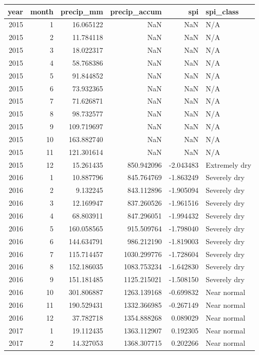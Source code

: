 \begin{tabular}{rrrrrl}
\toprule
year & month & precip\_mm & precip\_accum & spi & spi\_class \\
\midrule
2015 & 1 & 16.065122 & NaN & NaN & N/A \\
2015 & 2 & 11.784118 & NaN & NaN & N/A \\
2015 & 3 & 18.022317 & NaN & NaN & N/A \\
2015 & 4 & 58.768386 & NaN & NaN & N/A \\
2015 & 5 & 91.844852 & NaN & NaN & N/A \\
2015 & 6 & 73.932365 & NaN & NaN & N/A \\
2015 & 7 & 71.626871 & NaN & NaN & N/A \\
2015 & 8 & 98.732577 & NaN & NaN & N/A \\
2015 & 9 & 109.719697 & NaN & NaN & N/A \\
2015 & 10 & 163.882740 & NaN & NaN & N/A \\
2015 & 11 & 121.301614 & NaN & NaN & N/A \\
2015 & 12 & 15.261435 & 850.942096 & -2.043483 & Extremely dry \\
2016 & 1 & 10.887796 & 845.764769 & -1.863249 & Severely dry \\
2016 & 2 & 9.132245 & 843.112896 & -1.905094 & Severely dry \\
2016 & 3 & 12.169947 & 837.260526 & -1.961516 & Severely dry \\
2016 & 4 & 68.803911 & 847.296051 & -1.994432 & Severely dry \\
2016 & 5 & 160.058565 & 915.509764 & -1.798040 & Severely dry \\
2016 & 6 & 144.634791 & 986.212190 & -1.819003 & Severely dry \\
2016 & 7 & 115.714457 & 1030.299776 & -1.728604 & Severely dry \\
2016 & 8 & 152.186035 & 1083.753234 & -1.642830 & Severely dry \\
2016 & 9 & 151.181485 & 1125.215021 & -1.508150 & Severely dry \\
2016 & 10 & 301.806887 & 1263.139168 & -0.699832 & Near normal \\
2016 & 11 & 190.529431 & 1332.366985 & -0.267149 & Near normal \\
2016 & 12 & 37.782718 & 1354.888268 & 0.089029 & Near normal \\
2017 & 1 & 19.112435 & 1363.112907 & 0.192305 & Near normal \\
2017 & 2 & 14.327053 & 1368.307715 & 0.202266 & Near normal \\

\end{tabular}
